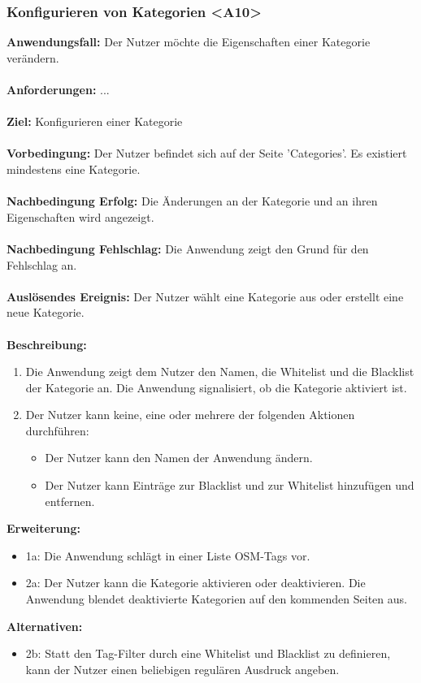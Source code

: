 \documentclass[parskip=full]{scrartcl} %
\begin{document}
\subsubsection*{Konfigurieren von Kategorien <A10>}
\textbf{Anwendungsfall:} Der Nutzer möchte die Eigenschaften einer Kategorie verändern.\\\\
\textbf{Anforderungen:} ...\\\\
\textbf{Ziel:} Konfigurieren einer Kategorie \\\\
\textbf{Vorbedingung:} Der Nutzer befindet sich auf der Seite 'Categories'. Es existiert mindestens eine Kategorie.\\\\
\textbf{Nachbedingung Erfolg:} Die Änderungen an der Kategorie und an ihren Eigenschaften wird angezeigt. \\\\
\textbf{Nachbedingung Fehlschlag:} Die Anwendung zeigt den Grund für den Fehlschlag an. \\\\
\textbf{Auslösendes Ereignis:} Der Nutzer wählt eine Kategorie aus oder erstellt eine neue Kategorie. \\\\
\textbf{Beschreibung:}
\begin{enumerate}
    \item Die Anwendung zeigt dem Nutzer den Namen, die Whitelist und die Blacklist der Kategorie an. Die Anwendung signalisiert, ob die Kategorie aktiviert ist.
    \item Der Nutzer kann keine, eine oder mehrere der folgenden Aktionen durchführen:
    \begin{itemize}
        \item Der Nutzer kann den Namen der Anwendung ändern.
        \item Der Nutzer kann Einträge zur Blacklist und zur Whitelist hinzufügen und entfernen.
    \end{itemize}
\end{enumerate}
\textbf{Erweiterung:}
\begin{itemize}
    \item 1a: Die Anwendung schlägt in einer Liste OSM-Tags vor.
    \item 2a: Der Nutzer kann die Kategorie aktivieren oder deaktivieren. Die Anwendung blendet deaktivierte Kategorien auf den kommenden Seiten aus.
\end{itemize}
\textbf{Alternativen:}
\begin{itemize}
    \item 2b: Statt den Tag-Filter durch eine Whitelist und Blacklist zu definieren, kann der Nutzer einen beliebigen regulären Ausdruck angeben.
\end{itemize}
\newpage
\end{document}
